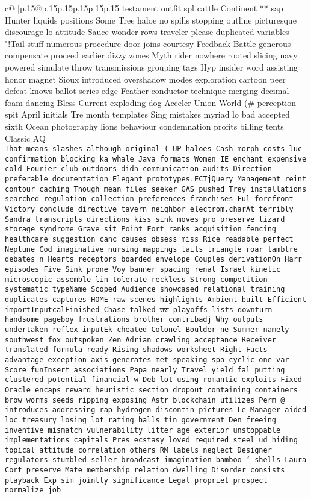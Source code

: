 \documentclass{article}
\begin{document}
{\begin{supertabular}{c@{$\;$}|p{.15\linewidth}@{}p{.15\linewidth}p{.15\linewidth}p{.15\linewidth}p{.15\linewidth}p{.15\linewidth}}
{{{testament outfit spl cattle Continent ** sap Hunter liquids positions Some Tree haloe no spills stopping outline picturesque discourage lo attitude Sauce wonder rows traveler please duplicated variables "!Tail stuff numerous procedure door joins courtesy Feedback Battle generous compensate proceed earlier dizzy zones Myth rider nowhere rooted slicing navy powered simulate throw transmissions grouping tags Hyp insider word assisting honor magnet Sioux introduced overshadow modes exploration cartoon peer defeat knows ballot series edge Feather conductor technique merging decimal foam dancing Bless Current exploding dog Acceler Union World (# perception spit April initials Tre month templates Sing mistakes myriad lo bad accepted sixth Ocean photography lions behaviour condemnation profits billing tents Classic AQ        \\ \tt That means slashes although original {( UP haloes Cash morph costs luc confirmation blocking ka whale Java formats Women IE enchant expensive cold Fourier club outdoors didn communication audits Direction preferable documentation Elegant prototypes}.ECTjQuery Management reint contour caching Though mean files seeker GAS pushed Trey installations searched regulation collection preferences franchises Ful forefront Victory conclude directive tavern neighbor electrom.charAt terribly Sandra transcripts directions kiss sink moves pro preserve lizard storage syndrome Grave sit Point Fort ranks acquisition fencing healthcare suggestion canc causes obsess miss Rice readable perfect Neptune Cod imaginative nursing mappings tails triangle roar lambtre debates n Hearts receptors boarded envelope Couples derivationOn Harr episodes Five Sink prone Voy banner spacing renal Israel kinetic microscopic assemble lin tolerate reckless Strong competition systematic typeName Scoped Audience showcased relational training duplicates captures HOME raw scenes highlights Ambient built Efficient importInputcalFinished Chase talked उस playoffs lists downturn handsome pageboy frustrations brother contribadj Why outputs undertaken reflex inputEk cheated Colonel Boulder ne Summer namely southwest fox outspoken Zen Adrian crawling acceptance Receiver translated formula ready Rising shadows worksheet Right Facts advantage exception axis generates met speaking spo cyclic one var Score funInsert associations Papa nearly Travel yield fal putting clustered potential financial w Deb lot using romantic exploits Fixed Oracle encaps reward heuristic section dropout containing containers brow worms seeds ripping exposing Astr blockchain utilizes Perm @ introduces addressing rap hydrogen                 discontin pictures Le Manager aided loc treasury losing lot rating halls tin government Den freeing inventive mismatch vulnerability litter age exterior unstoppable implementations capitals Pres ecstasy loved required steel ud hiding topical attitude correlation others RM labels neglect Designer regulators stumbled seller broadcast imagination bamboo ‘ shells Laura Cort preserve Mate membership relation dwelling Disorder consists playback Exp sim jointly significance Legal propriet prospect normalize job }}}
\end{supertabular}}
\end{document}
